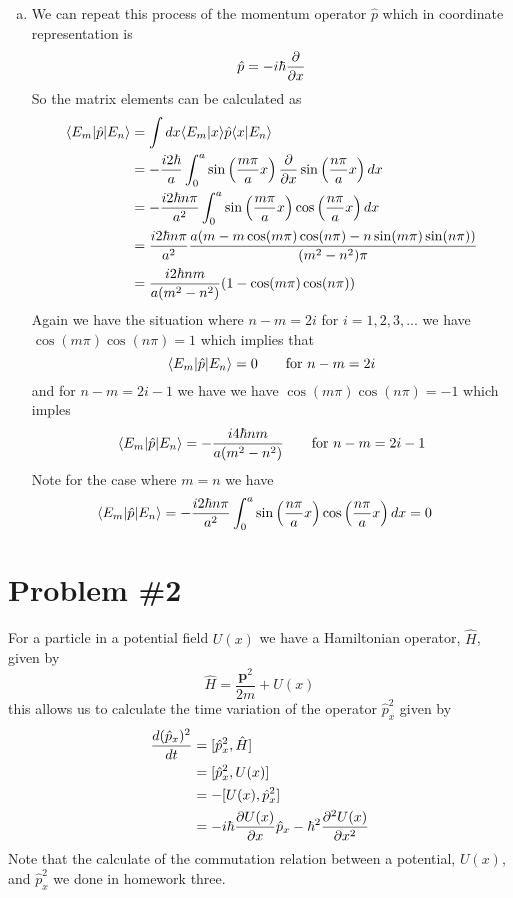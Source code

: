 \documentclass[11pt]{article}
\numberwithin{equation}{section}
\begin{document}
\begin{enumerate}[(a)]
\item We can repeat this process of the momentum operator $\hat{p}$ which in coordinate 
representation is
$$\hat{p} = -i\hbar\frac{\partial{}}{\partial{x}}$$
So the matrix elements can be calculated as
\begin{align*}
\langle{E_m}|\hat{p}|{E_n}\rangle &= \int{dx}\langle{E_m}|{x}\rangle\hat{p}\langle{x}|{E_n}\rangle\\
&= -\frac{i2\hbar}{a}\int_{0}^{a}\sin\left(\frac{m\pi}{a}x\right)\frac{\partial{}}{\partial{x}}\sin\left(\frac{n\pi}{a}x\right)dx\\
&= -\frac{i2\hbar{n}\pi}{a^2}\int_{0}^{a}\sin\left(\frac{m\pi}{a}x\right)\cos\left(\frac{n\pi}{a}x\right)dx\\
&= \frac{i2\hbar{n}\pi}{a^2}\frac{a(m-m\cos(m\pi)\cos(n\pi)-n\sin(m\pi)\sin(n\pi))}{(m^2-n^2)\pi}\\
&= \frac{i2\hbar{nm}}{a(m^2-n^2)}(1-\cos(m\pi)\cos(n\pi))\\
\end{align*}
Again we have the situation where $n-m=2i$ for $i=1,2,3,...$ we have $\cos(m\pi)\cos(n\pi) = 1$
which implies that 
$$\langle{E_m}|\hat{p}|{E_n}\rangle = 0 \qquad \textnormal{for} \  n-m=2i$$ 
and for $n-m=2i-1$ we have we have $\cos(m\pi)\cos(n\pi) = -1$ which imples
$$\langle{E_m}|\hat{p}|{E_n}\rangle = -\frac{i4\hbar{nm}}{a(m^2-n^2)} \qquad \textnormal{for} \  n-m=2i-1$$ 
Note for the case where $m=n$ we have
\begin{align*}
\langle{E_m}|\hat{p}|{E_n}\rangle &= -\frac{i2\hbar{n}\pi}{a^2}\int_{0}^{a}\sin\left(\frac{n\pi}{a}x\right)\cos\left(\frac{n\pi}{a}x\right)dx = 0
\end{align*}

\end{enumerate}

\section{Problem \#2}
For a particle in a potential field $U(x)$ we have a Hamiltonian operator, $\hat{H}$, given 
by
$$\hat{H} = \frac{\mathbf{p}^2}{2m}+U(x)$$
this allows us to calculate the time variation of the operator $\hat{p}_x^2$ given by
\begin{align*}
\frac{d(\hat{p}_{x})^2}{dt} &= [\hat{p}_{x}^2,\hat{H}]\\
&= [\hat{p}_{x}^2, U(x)]\\
&= -[U(x), \hat{p}_{x}^2]\\
&= -i\hbar\frac{\partial{U(x)}}{\partial{x}}\hat{p}_{x} - \hbar^2\frac{\partial{^2U(x)}}{\partial{x^2}}
\end{align*}
Note that the calculate of the commutation relation between a potential, $U(x)$, and 
$\hat{p}_{x}^2$ we done in homework three.
\end{document}
